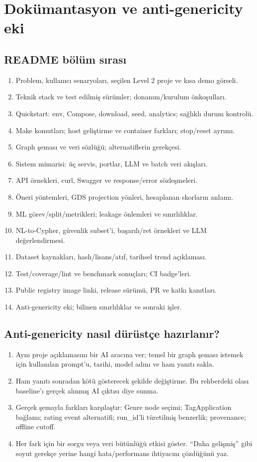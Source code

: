 \documentclass[11pt,a4paper]{article}
\begin{document}
\section{Dokümantasyon ve anti-genericity eki}
\subsection{README bölüm sırası}
\begin{enumerate}
\item Problem, kullanıcı senaryoları, seçilen Level 2 proje ve kısa demo görseli.
\item Teknik stack ve test edilmiş sürümler; donanım/kurulum önkoşulları.
\item Quickstart: env, Compose, download, seed, analytics; sağlıklı durum kontrolü.
\item Make komutları; host geliştirme ve container farkları; stop/reset ayrımı.
\item Graph şeması ve veri sözlüğü; alternatiflerin gerekçesi.
\item Sistem mimarisi: üç servis, portlar, LLM ve batch veri akışları.
\item API örnekleri, curl, Swagger ve response/error sözleşmeleri.
\item Öneri yöntemleri, GDS projection yönleri, hesaplanan skorların anlamı.
\item ML görev/split/metrikleri; leakage önlemleri ve sınırlılıklar.
\item NL-to-Cypher, güvenlik subset'i, başarılı/ret örnekleri ve LLM değerlendirmesi.
\item Dataset kaynakları, hash/lisans/atıf, tarihsel trend açıklaması.
\item Test/coverage/lint ve benchmark sonuçları; CI badge'leri.
\item Public registry image linki, release sürümü, PR ve katkı kanıtları.
\item Anti-genericity eki; bilinen sınırlılıklar ve sonraki işler.
\end{enumerate}

\subsection{Anti-genericity nasıl dürüstçe hazırlanır?}
\begin{enumerate}
\item Aynı proje açıklamasını bir AI aracına ver; temel bir graph şeması istemek için kullanılan prompt'u, tarihi, model adını ve ham yanıtı sakla.
\item Ham yanıtı sonradan kötü gösterecek şekilde değiştirme. Bu rehberdeki olası baseline'ı gerçek alınmış AI çıktısı diye sunma.
\item Gerçek şemayla farkları karşılaştır: Genre node seçimi; TagApplication bağlamı; rating event alternatifi; run\_id'li türetilmiş benzerlik; provenance; offline cutoff.
\item Her fark için bir sorgu veya veri bütünlüğü etkisi göster. ``Daha gelişmiş'' gibi soyut gerekçe yerine hangi hata/performans ihtiyacını çözdüğünü yaz.
\end{enumerate}
\end{document}
